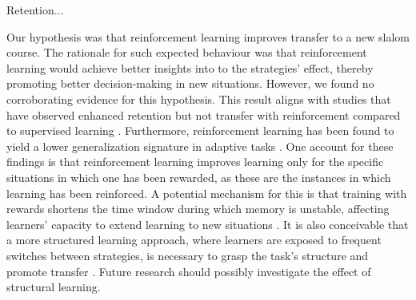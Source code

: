 \documentclass{article}
\begin{document}
Retention...

Our hypothesis was that reinforcement learning improves transfer to a new slalom course. The rationale for such expected behaviour was that reinforcement learning would achieve better insights into to the strategies' effect, thereby promoting better decision-making in new situations. However, we found no corroborating evidence for this hypothesis. This result aligns with studies that have observed enhanced retention but not transfer with reinforcement compared to supervised learning \cite{hasson_reinforcement_2015}. Furthermore, reinforcement learning has been found to yield a lower generalization signature in adaptive tasks \cite{lior_shmuelof_overcoming_2012}. One account for these findings is that reinforcement learning improves learning only for the specific situations in which one has been rewarded, as these are the instances in which learning has been reinforced. A potential mechanism for this is that training with rewards shortens the time window during which memory is unstable, affecting learners' capacity to extend learning to new situations \cite{robertson_memory_2018}. It is also conceivable that a more structured learning approach, where learners are exposed to frequent switches between strategies, is necessary to grasp the task's structure and promote transfer \cite{braun_structure_2010}. Future research should possibly investigate the effect of structural learning. 
\end{document}
